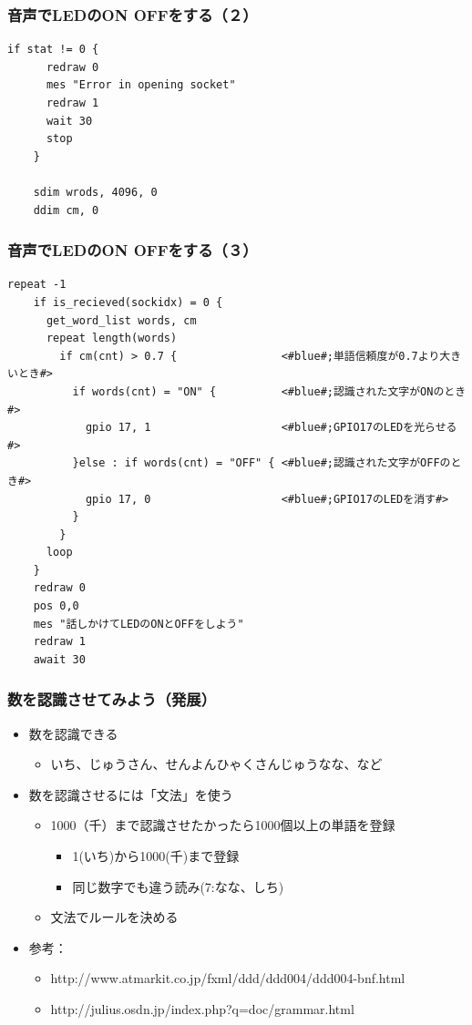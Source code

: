 \documentclass[14pt]{beamer}
\begin{document}
\begin{frame}[fragile]
  \frametitle{音声でLEDのON OFFをする（２）}
  \begin{lstlisting}[caption=ledvoice.hsp,label=ledvoice.hsp]
    if stat != 0 {
      redraw 0
      mes "Error in opening socket"
      redraw 1
      wait 30
      stop
    }

    sdim wrods, 4096, 0
    ddim cm, 0
  \end{lstlisting}
\end{frame}

\begin{frame}[fragile]
  \frametitle{音声でLEDのON OFFをする（３）}
  \begin{lstlisting}[caption=ledvoice.hsp,label=ledvoice.hsp,basicstyle=\scriptsize]
    repeat -1
    if is_recieved(sockidx) = 0 {
      get_word_list words, cm
      repeat length(words)
        if cm(cnt) > 0.7 {                <#blue#;単語信頼度が0.7より大きいとき#>
          if words(cnt) = "ON" {          <#blue#;認識された文字がONのとき#>
            gpio 17, 1                    <#blue#;GPIO17のLEDを光らせる#>
          }else : if words(cnt) = "OFF" { <#blue#;認識された文字がOFFのとき#>
            gpio 17, 0                    <#blue#;GPIO17のLEDを消す#>
          }
        }
      loop
    }
    redraw 0
    pos 0,0
    mes "話しかけてLEDのONとOFFをしよう"
    redraw 1
    await 30
  \end{lstlisting}
\end{frame}

\begin{frame}
  \frametitle{数を認識させてみよう（発展）}
  \begin{itemize}
    \item 数を認識できる
          \begin{itemize}
            \item いち、じゅうさん、せんよんひゃくさんじゅうなな、など
          \end{itemize}
    \item 数を認識させるには「文法」を使う
          \begin{itemize}
            \item 1000（千）まで認識させたかったら1000個以上の単語を登録
                  \begin{itemize}
                    \item 1(いち)から1000(千)まで登録
                    \item 同じ数字でも違う読み(7:なな、しち)
                  \end{itemize}
            \item 文法でルールを決める
          \end{itemize}
    \item 参考：
          \begin{itemize}
            \item http://www.atmarkit.co.jp/fxml/ddd/ddd004/ddd004-bnf.html
            \item http://julius.osdn.jp/index.php?q=doc/grammar.html
          \end{itemize}
  \end{itemize}
\end{frame}
\end{document}
